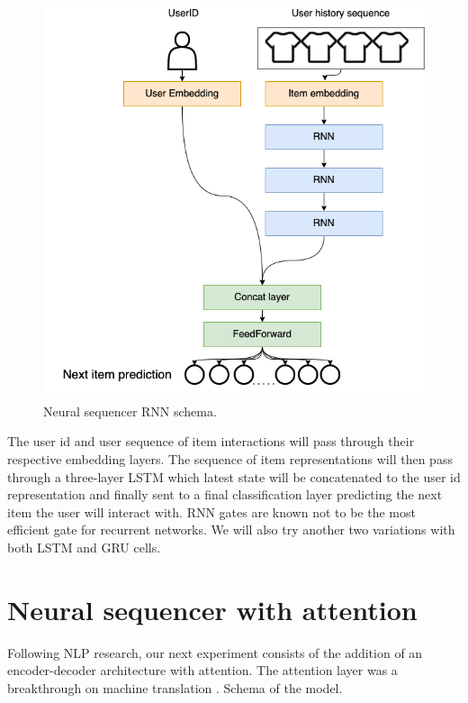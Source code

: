 \documentclass{kththesis}
\begin{document}
\begin{figure}[H]
    \centering
    \includegraphics[scale=0.45]{images/models/RNN.png}
    \caption{Neural sequencer RNN schema.}
\end{figure}

The user id and user sequence of item interactions will pass through their respective embedding layers. The sequence of item representations will then pass through a three-layer LSTM which latest state will be concatenated to the user id representation and finally sent to a final classification layer predicting the next item the user will interact with. RNN gates are known not to be the most efficient gate for recurrent networks. We will also try another two variations with both LSTM and GRU cells.

\section{Neural sequencer with attention}
Following NLP research, our next experiment consists of the addition of an encoder-decoder architecture with attention. The attention layer was a breakthrough on machine translation \cite{attention}. Schema of the model.
\end{document}
